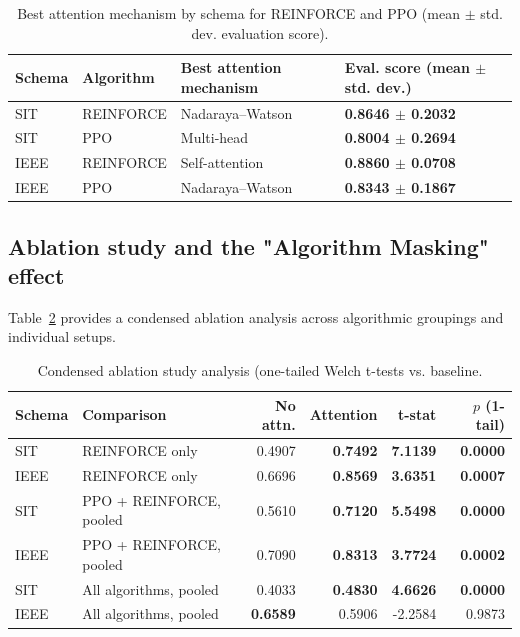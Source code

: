 \documentclass[sn-basic]{sn-jnl}%
\begin{document}
\begin{table}[htbp]
\centering
	\caption{Best attention mechanism by schema for \textsc{REINFORCE} and \textsc{PPO} (mean $\pm$ std. dev. evaluation score).}
	\label{tab:best_mech_ppo_rf}
	\begin{tabular}{l l l l}
	\toprule
	\textbf{Schema} & \textbf{Algorithm} & \textbf{Best attention mechanism} & \textbf{Eval. score (mean $\pm$ std. dev.)}\\
	\midrule
	SIT & \textsc{REINFORCE} & Nadaraya--Watson & \textbf{0.8646 $\pm$ 0.2032}\\
	SIT & \textsc{PPO} & Multi-head & \textbf{0.8004 $\pm$ 0.2694}\\
	IEEE & \textsc{REINFORCE} & Self-attention & \textbf{0.8860 $\pm$ 0.0708}\\
	IEEE & \textsc{PPO} & Nadaraya--Watson & \textbf{0.8343 $\pm$ 0.1867}\\
	\bottomrule
	\end{tabular}
\end{table}

\subsection{Ablation study and the "Algorithm Masking" effect} \label{sec:ablation_results}

Table~\ref{tab:ablation_condensed} provides a condensed ablation analysis across algorithmic groupings and individual setups.

\begin{table}[htbp]
	\centering
	\caption{Condensed ablation study analysis (one-tailed Welch t-tests vs. baseline.}
	\label{tab:ablation_condensed}
	\begin{tabular}{l l r r r r}
		\toprule
		\textbf{Schema} & \textbf{Comparison} & \textbf{No attn.} & \textbf{Attention} & \textbf{t-stat} & \textbf{$p$ (1-tail)}\\
		\midrule
		SIT & \textsc{REINFORCE} only & 0.4907 & \textbf{0.7492} & \textbf{7.1139} & \textbf{0.0000}\\
		IEEE & \textsc{REINFORCE} only & 0.6696 & \textbf{0.8569} & \textbf{3.6351} & \textbf{0.0007}\\
		SIT & PPO + \textsc{REINFORCE}, pooled & 0.5610 & \textbf{0.7120} & \textbf{5.5498} & \textbf{0.0000}\\
		IEEE & PPO + \textsc{REINFORCE}, pooled & 0.7090 & \textbf{0.8313} & \textbf{3.7724} & \textbf{0.0002}\\
		SIT & All algorithms, pooled & 0.4033 & \textbf{0.4830} & \textbf{4.6626} & \textbf{0.0000}\\
		IEEE & All algorithms, pooled & \textbf{0.6589} & 0.5906 & -2.2584 & 0.9873\\
		\bottomrule
	\end{tabular}
\end{table}
\end{document}
